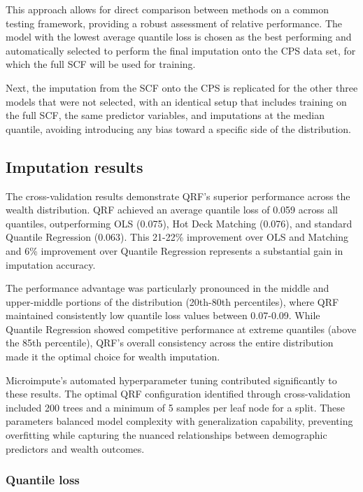 This approach allows for direct comparison between methods on a common testing framework, providing a robust assessment of relative performance. The model with the lowest average quantile loss is chosen as the best performing and automatically selected to perform the final imputation onto the CPS data set, for which the full SCF will be used for training. 

Next, the imputation from the SCF onto the CPS is replicated for the other three models that were not selected, with an identical setup that includes training on the full SCF, the same predictor variables, and imputations at the median quantile, avoiding introducing any bias toward a specific side of the distribution. 

\subsection{Imputation results}

The cross-validation results demonstrate QRF's superior performance across the wealth distribution. QRF achieved an average quantile loss of 0.059 across all quantiles, outperforming OLS (0.075), Hot Deck Matching (0.076), and standard Quantile Regression (0.063). This 21-22\% improvement over OLS and Matching and 6\% improvement over Quantile Regression represents a substantial gain in imputation accuracy.

The performance advantage was particularly pronounced in the middle and upper-middle portions of the distribution (20th-80th percentiles), where QRF maintained consistently low quantile loss values between 0.07-0.09. While Quantile Regression showed competitive performance at extreme quantiles (above the 85th percentile), QRF's overall consistency across the entire distribution made it the optimal choice for wealth imputation.

Microimpute's automated hyperparameter tuning contributed significantly to these results. The optimal QRF configuration identified through cross-validation included 200 trees and a minimum of 5 samples per leaf node for a split. These parameters balanced model complexity with generalization capability, preventing overfitting while capturing the nuanced relationships between demographic predictors and wealth outcomes.

\subsubsection{Quantile loss}

